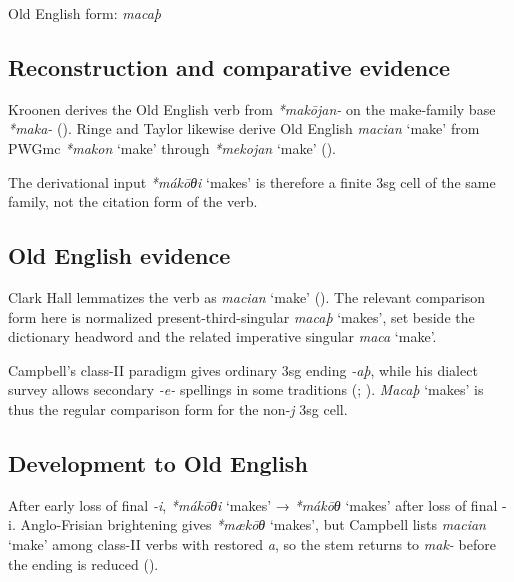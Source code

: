 \documentclass[
  british,
  a4paper,
  openany]{book}
\providecommand{\Recon}[1]{\emph{*#1}}
{\catcode`→=\active \global\def→{\ensuremath{\rightarrow}}}
\providecommand{\Recon}[1]{\emph{*#1}}
{\catcode`→=\active \global\def→{\ensuremath{\rightarrow}}}
\begin{document}
Old English form: \emph{macaþ}

\subsection{Reconstruction and comparative
evidence}\label{reconstruction-and-comparative-evidence-127}

Kroonen derives the Old English verb from {\emph{*makōjan-}} on the
make-family base \emph{*maka-} (). Ringe and Taylor likewise derive Old English {\emph{macian}}
`make' from PWGmc \Recon{makon} `make' through \Recon{mekojan} `make'
().

The derivational input {\Recon{mákōθi} `makes'} is therefore a finite
3sg cell of the same family, not the citation form of the verb.

\subsection{Old English evidence}\label{old-english-evidence-127}

Clark Hall lemmatizes the verb as {\emph{macian}} `make'
(). The relevant
comparison form here is normalized present-third-singular {\emph{macaþ}}
`makes', set beside the dictionary headword and the related imperative
singular {\emph{maca}} `make'.

Campbell's class-II paradigm gives ordinary 3sg ending \emph{-aþ}, while
his dialect survey allows secondary \emph{-e-} spellings in some
traditions (;
). {\emph{Macaþ}} `makes' is
thus the regular comparison form for the non-\emph{j} 3sg cell.

\subsection{Development to Old
English}\label{development-to-old-english-127}

After early loss of final \emph{-i}, \Recon{mákōθi} `makes' →
\Recon{mákōθ} `makes' after loss of final -i. Anglo-Frisian brightening
gives \Recon{mækōθ} `makes', but Campbell lists {\emph{macian}} `make'
among class-II verbs with restored \emph{a}, so the stem returns to
\emph{mak-} before the ending is reduced
().
\end{document}
